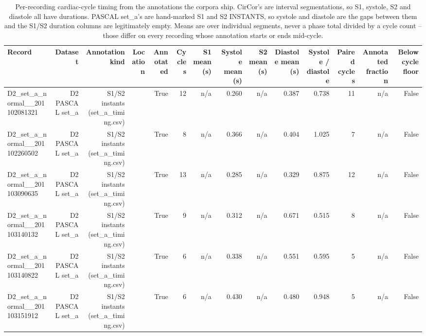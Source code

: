 \begin{table}[htbp]
  \centering
  \caption{Per-recording cardiac-cycle timing from the annotations the corpora ship. CirCor's are interval segmentations, so S1, systole, S2 and diastole all have durations. PASCAL set\_a's are hand-marked S1 and S2 INSTANTS, so systole and diastole are the gaps between them and the S1/S2 duration columns are legitimately empty. Means are over individual segments, never a phase total divided by a cycle count -- those differ on every recording whose annotation starts or ends mid-cycle.}
  \label{tab:seg-01}
  \begin{tabular}{lrrrrrrrrrrrrr}
    \toprule
    Record & Dataset & Annotation kind & Location & Annotated & Cycles & S1 mean (s) & Systole mean (s) & S2 mean (s) & Diastole mean (s) & Systole / diastole & Paired cycles & Annotated fraction & Below cycle floor \\
    \midrule
    D2\_set\_a\_normal\_\_201102081321 & D2 PASCAL set\_a & S1/S2 instants (set\_a\_timing.csv) &  & True & 12 & n/a & 0.260 & n/a & 0.387 & 0.738 & 11 & n/a & False \\
    D2\_set\_a\_normal\_\_201102260502 & D2 PASCAL set\_a & S1/S2 instants (set\_a\_timing.csv) &  & True & 8 & n/a & 0.366 & n/a & 0.404 & 1.025 & 7 & n/a & False \\
    D2\_set\_a\_normal\_\_201103090635 & D2 PASCAL set\_a & S1/S2 instants (set\_a\_timing.csv) &  & True & 13 & n/a & 0.285 & n/a & 0.329 & 0.875 & 12 & n/a & False \\
    D2\_set\_a\_normal\_\_201103140132 & D2 PASCAL set\_a & S1/S2 instants (set\_a\_timing.csv) &  & True & 9 & n/a & 0.312 & n/a & 0.671 & 0.515 & 8 & n/a & False \\
    D2\_set\_a\_normal\_\_201103140822 & D2 PASCAL set\_a & S1/S2 instants (set\_a\_timing.csv) &  & True & 6 & n/a & 0.338 & n/a & 0.551 & 0.595 & 5 & n/a & False \\
    D2\_set\_a\_normal\_\_201103151912 & D2 PASCAL set\_a & S1/S2 instants (set\_a\_timing.csv) &  & True & 6 & n/a & 0.430 & n/a & 0.480 & 0.948 & 5 & n/a & False \\

\end{tabular}
\end{table}

